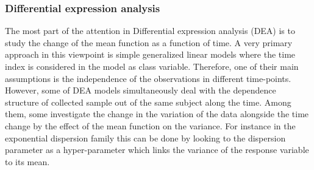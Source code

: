 \documentclass[]{article}
\begin{document}
		\subsubsection{Differential expression analysis}
		The most part of the attention in Differential expression analysis (DEA) is to study the change of the mean function as a function of time. A very primary approach in this viewpoint is simple generalized linear models where the time index is considered in the model as class variable. Therefore, one of their main assumptions is the independence of the observations in different time-points. However, some of DEA models simultaneously deal with the dependence structure of collected sample out of the same subject along the time. Among them, some investigate the change in the variation of the data alongside the time change by the effect of the mean function on the variance. For instance in the exponential dispersion family this can be done by looking to the dispersion parameter as a hyper-parameter which links the variance of the response variable to its mean. 
		
\end{document}
